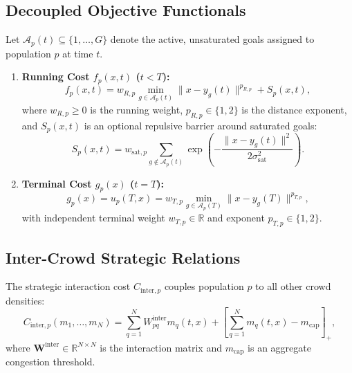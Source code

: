 \documentclass[11pt,a4paper]{article}
\begin{document}
\subsection{Decoupled Objective Functionals}
Let $\mathcal{A}_p(t) \subseteq \{1, \dots, G\}$ denote the active, unsaturated goals assigned to population $p$ at time $t$.
\begin{enumerate}
    \item \textbf{Running Cost $f_p(x, t)$ ($t < T$):}
    \begin{equation}
    f_p(x, t) = w_{R, p} \min_{g \in \mathcal{A}_p(t)} \|x - y_g(t)\|^{p_{R, p}} + S_p(x, t),
    \end{equation}
    where $w_{R, p} \ge 0$ is the running weight, $p_{R, p} \in \{1, 2\}$ is the distance exponent, and $S_p(x, t)$ is an optional repulsive barrier around saturated goals:
    \begin{equation}
    S_p(x, t) = w_{\text{sat}, p} \sum_{g \notin \mathcal{A}_p(t)} \exp\left( -\frac{\|x - y_g(t)\|^2}{2 \sigma_{\text{sat}}^2} \right).
    \end{equation}
    \item \textbf{Terminal Cost $g_p(x)$ ($t = T$):}
    \begin{equation}
    g_p(x) = u_p(T, x) = w_{T, p} \min_{g \in \mathcal{A}_p(T)} \|x - y_g(T)\|^{p_{T, p}},
    \end{equation}
    with independent terminal weight $w_{T, p} \in \mathbb{R}$ and exponent $p_{T, p} \in \{1, 2\}$.
\end{enumerate}

\subsection{Inter-Crowd Strategic Relations}
The strategic interaction cost $C_{\text{inter}, p}$ couples population $p$ to all other crowd densities:
\begin{equation}
C_{\text{inter}, p}(m_1, \dots, m_N) = \sum_{q=1}^N W_{pq}^{\text{inter}} m_q(t, x) + \left[ \sum_{q=1}^N m_q(t, x) - m_{\text{cap}} \right]_+,
\end{equation}
where $\mathbf{W}^{\text{inter}} \in \mathbb{R}^{N \times N}$ is the interaction matrix and $m_{\text{cap}}$ is an aggregate congestion threshold.
\end{document}

